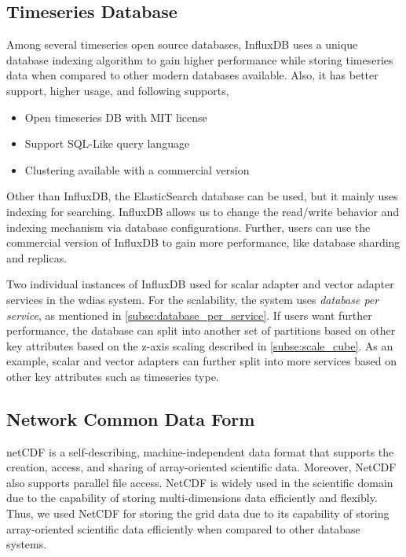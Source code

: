 \subsection{Timeseries Database}
\label{subse:influxdb}

Among several timeseries open source databases, InfluxDB \cite{influxdbInfluxDBDocumentation} uses a unique database indexing algorithm to gain higher performance while storing timeseries data when compared to other modern databases available. Also, it has better support, higher usage, and following supports,

\begin{itemize}
  \item Open timeseries DB with MIT license
  \item Support SQL-Like query language
  \item Clustering available with a commercial version
\end{itemize}

Other than InfluxDB, the ElasticSearch database can be used, but it mainly uses indexing for searching. InfluxDB allows us to change the read/write behavior and indexing mechanism via database configurations. Further, users can use the commercial version of InfluxDB to gain more performance, like database sharding and replicas.

Two individual instances of InfluxDB used for scalar adapter and vector adapter services in the \acrshort{wdias} system. For the scalability, the system uses \emph{database per service}, as mentioned in \cref{subse:database_per_service}. If users want further performance, the database can split into another set of partitions based on other key attributes based on the z-axis scaling described in \cref{subse:scale_cube}. As an example, scalar and vector adapters can further split into more services based on other key attributes such as timeseries type.

\subsection{Network Common Data Form}
\label{subse:netcdf}

\acrshort{netCDF} \cite{unidataUnidataNetCDF} is a self-describing, machine-independent data format that supports the creation, access, and sharing of array-oriented scientific data. Moreover, NetCDF also supports parallel file access. NetCDF is widely used in the scientific domain due to the capability of storing multi-dimensions data efficiently and flexibly. Thus, we used NetCDF for storing the grid data due to its capability of storing array-oriented scientific data efficiently when compared to other database systems.

